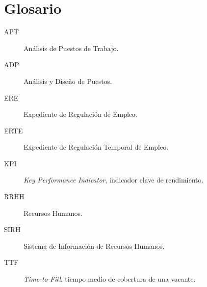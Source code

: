 %

\chapter*{Glosario}

\begin{description}
  \item[APT] Análisis de Puestos de Trabajo.
  \item[ADP] Análisis y Diseño de Puestos.
  \item[ERE] Expediente de Regulación de Empleo.
  \item[ERTE] Expediente de Regulación Temporal de Empleo.
  \item[KPI] \textit{Key Performance Indicator}, indicador clave de rendimiento.
  \item[RRHH] Recursos Humanos.
  \item[SIRH] Sistema de Información de Recursos Humanos.
  \item[TTF] \textit{Time-to-Fill}, tiempo medio de cobertura de una vacante.
\end{description}

\endinput
